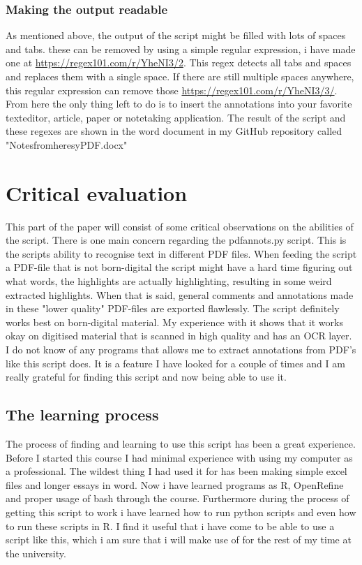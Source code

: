 \documentclass{article}
\begin{document}
\subsubsection{Making the output readable}
As mentioned above, the output of the script might be filled with lots of spaces and tabs. these can be removed by using a simple regular expression, i have made one at \url{https://regex101.com/r/YheNI3/2}. This regex detects all tabs and spaces and replaces them with a single space. If there are still multiple spaces anywhere, this regular expression can remove those \url{https://regex101.com/r/YheNI3/3/}. From here the only thing left to do is to insert the annotations into your favorite texteditor, article, paper or notetaking application. The result of the script and these regexes are shown in the word document in my GitHub repository called "Notes\textunderscore from\textunderscore heresy\textunderscore PDF.docx"

\section{Critical evaluation}
This part of the paper will consist of some critical observations on the abilities of the script. There is one main concern regarding the pdfannots.py script. This is the scripts ability to recognise text in different PDF files. When feeding the script a PDF-file that is not born-digital the script might have a hard time figuring out what words, the highlights are actually highlighting, resulting in some weird extracted highlights. When that is said, general comments and annotations made in these "lower quality" PDF-files are exported flawlessly. The script definitely works best on born-digital material. My experience with it shows that it works okay on digitised material that is scanned in high quality and has an OCR layer.\newline
I do not know of any programs that allows me to extract annotations from PDF's like this script does. It is a feature I have looked for a couple of times and I am really grateful for finding this script and now being able to use it.
\subsection{The learning process}
The process of finding and learning to use this script has been a great experience. Before I started this course I had minimal experience with using my computer as a professional. The wildest thing I had used it for has been making simple excel files and longer essays in word. Now i have learned programs as R, OpenRefine and proper usage of bash through the course. Furthermore during the process of getting this script to work i have learned how to run python scripts and even how to run these scripts in R. I find it useful that i have come to be able to use a script like this, which i am sure that i will make use of for the rest of my time at the university.
\end{document}
